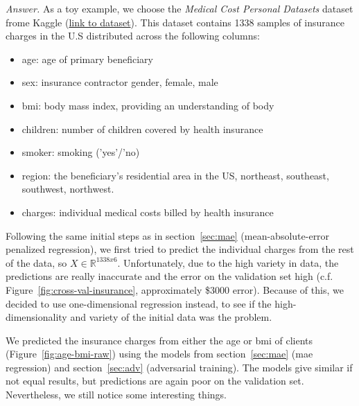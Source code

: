 \documentclass[10pt]{article}
\newenvironment{exercise}[2][Exercise]{\begin{trivlist}
  \item[\hskip \labelsep {\bfseries #1}\hskip \labelsep {\bfseries #2.}]}{\end{trivlist}}
\begin{document}
\begin{exercise}{8}
\textit{Answer.} As a toy example, we choose the \textit{Medical Cost Personal Datasets} dataset frome Kaggle (\href{https://www.kaggle.com/mirichoi0218/insurance}{link to dataset}). This dataset contains 1338 samples of insurance charges in the U.S distributed across the following columns: 
\begin{itemize}
    \item age: age of primary beneficiary
    \item sex: insurance contractor gender, female, male
    \item bmi: body mass index, providing an understanding of body
    \item children: number of children covered by health insurance 
    \item smoker: smoking ('yes'/'no)
    \item region: the beneficiary's residential area in the US, northeast, southeast, southwest, northwest.
    \item charges: individual medical costs billed by health insurance
\end{itemize}
Following the same initial steps as in section~\ref{sec:mae} (mean-absolute-error penalized regression), we first tried to predict the individual charges from the rest of the data, so $X\in\mathbb{R}^{1338x6}$. Unfortunately, due to the high variety in data, the predictions are really inaccurate and the error on the validation set high (c.f. Figure~\ref{fig:cross-val-insurance}, approximately \$3000 error). Because of this, we decided to use one-dimensional regression instead, to see if the high-dimensionality and variety of the initial data was the problem.

We predicted the insurance charges from either the age or bmi of clients (Figure~\ref{fig:age-bmi-raw}) using the models from section~\ref{sec:mae} (mae regression) and section~\ref{sec:adv} (adversarial training). The models give similar if not equal results, but predictions are again poor on the validation set. Nevertheless, we still notice some interesting things. 


\end{exercise}
\end{document}
